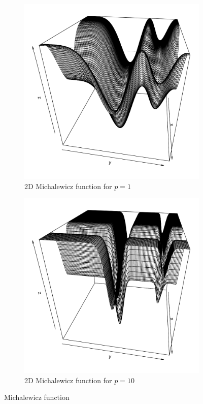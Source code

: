 \documentclass [PhD] {package/uclathes}
\begin{document}
\begin{figure}%
\centering
\begin{subfigure}[b]{0.4\textwidth}
\centering
\includegraphics[width=\textwidth]{chapters/EGO/pdfs/michal_m1}
\caption{2D Michalewicz function for \(p = 1\)}
\end{subfigure}
\hfill
\begin{subfigure}[b]{0.4\textwidth}
\centering
\includegraphics[width=\textwidth]{chapters/EGO/pdfs/michal_m10}
\caption{2D Michalewicz function for \(p = 10\)}
\end{subfigure}
\caption{Michalewicz function}
\end{figure}
\end{document}
